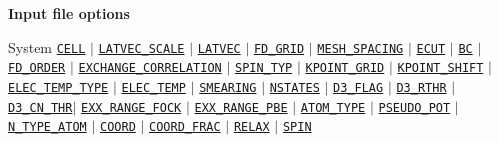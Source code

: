\begin{frame}[allowframebreaks]{\textbf{Input file options}} \label{Index}
\vspace{-2mm}
\begin{block}{System}
\hyperlink{CELL}{\texttt{CELL}} $\vert$ 
\hyperlink{LATVEC_SCALE}{\texttt{LATVEC\_SCALE}} $\vert$ 
\hyperlink{LATVEC}{\texttt{LATVEC}}  $\vert$ 
\hyperlink{FD_GRID}{\texttt{FD\_GRID}} $\vert$ 
\hyperlink{MESH_SPACING}{\texttt{MESH\_SPACING}} $\vert$ 
\hyperlink{ECUT}{\texttt{ECUT}} $\vert$ 
\hyperlink{BC}{\texttt{BC}} $\vert$ 
\hyperlink{FD_ORDER}{\texttt{FD\_ORDER}} $\vert$ 
\hyperlink{EXCHANGE_CORRELATION}{\texttt{EXCHANGE\_CORRELATION}} $\vert$ 
\hyperlink{SPIN_TYP}{\texttt{SPIN\_TYP}} $\vert$ 
\hyperlink{KPOINT_GRID}{\texttt{KPOINT\_GRID}} $\vert$ 
\hyperlink{KPOINT_SHIFT}{\texttt{KPOINT\_SHIFT}} $\vert$ 
\hyperlink{ELEC_TEMP_TYPE}{\texttt{ELEC\_TEMP\_TYPE}} $\vert$ 
\hyperlink{ELEC_TEMP}{\texttt{ELEC\_TEMP}} $\vert$ 
\hyperlink{SMEARING}{\texttt{SMEARING}} $\vert$ 
\hyperlink{NSTATES}{\texttt{NSTATES}} $\vert$ 
\hyperlink{D3_FLAG}{\texttt{D3\_FLAG}} $\vert$ 
\hyperlink{D3_RTHR}{\texttt{D3\_RTHR}} $\vert$ 
\hyperlink{D3_CN_THR}{\texttt{D3\_CN\_THR}}$\vert$ 
\hyperlink{EXX_RANGE_FOCK}{\texttt{EXX\_RANGE\_FOCK}} $\vert$ 
\hyperlink{EXX_RANGE_PBE}{\texttt{EXX\_RANGE\_PBE}} $\vert$ 
\hyperlink{ATOM_TYPE}{\texttt{ATOM\_TYPE}} $\vert$ 
\hyperlink{PSEUDO_POT}{\texttt{PSEUDO\_POT}}  $\vert$ 
\hyperlink{N_TYPE_ATOM}{\texttt{N\_TYPE\_ATOM}} $\vert$ 
\hyperlink{COORD}{\texttt{COORD}} $\vert$ 
\hyperlink{COORD_FRAC}{\texttt{COORD\_FRAC}} $\vert$ 
\hyperlink{RELAX}{\texttt{RELAX}} $\vert$ 
\hyperlink{SPIN}{\texttt{SPIN}} 
\end{block}


\end{frame}
